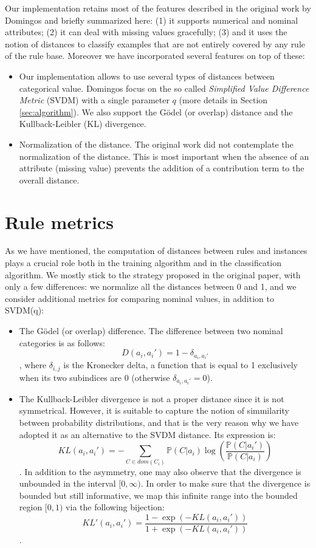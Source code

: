\documentclass[a4paper]{article}
\begin{document}
Our implementation retains most of the features described in the original work by Domingos and briefly summarized here: (1) it supports numerical and nominal attributes; (2) it can deal with missing values gracefully; (3) and it uses the notion of distances to classify examples that are not entirely covered by any rule of the rule base. Moreover we have incorporated several features on top of these:
\begin{itemize}
	\item Our implementation allows to use several types of distances between categorical value. Domingos focus on the so called \emph{Simplified Value Difference Metric} (SVDM) with a single parameter $ q $ (more details in Section \ref{sec:algorithm}). We also support the G\"odel (or overlap) distance and the Kullback-Leibler (KL) divergence.
    \item Normalization of the distance. The original work did not contemplate the normalization of the distance. This is most important when the absence of an attribute (missing value) prevents the addition of a contribution term to the overall distance.
\end{itemize}

\section{Rule metrics}
\label{sec:distance}

As we have mentioned, the computation of distances between rules and instances plays a crucial role both in the training algorithm and in the classification algorithm. We mostly stick to the strategy proposed in the original paper, with only a few differences: we normalize all the distances between 0 and 1, and we consider additional metrics for comparing nominal values, in addition to SVDM(q):
\begin{itemize}
	\item The G\"odel (or overlap) difference. The difference between two nominal categories is as follows:
	\[D(a_i, a_i') = 1 - \delta_{a_i, a_i'} \],
	where $ \delta_{i,j} $ is the Kronecker delta, a function that is equal to 1 exclusively when its two subindices are 0 (otherwise $ \delta_{a_i, a_i'} = 0 $).
	\item The Kullback-Leibler divergence is not a proper distance since it is not symmetrical. However, it is suitable to capture the notion of simmilarity between probability distributions, and that is the very reason why we have adopted it as an alternative to the SVDM distance. Its expression is:
	\[ KL(a_i, a_i') = -\sum_{C \in dom(C_i)} \mathbb{P}(C|a_i) \log \left( \frac{\mathbb{P}(C|a_i')}{\mathbb{P}(C|a_i)} \right) \].
	In addition to the asymmetry, one may also observe that the divergence is unbounded in the interval $ [0, \infty) $. In order to make sure that the divergence is bounded but still informative, we map this infinite range into the bounded region $ [0, 1) $ via the following bijection:
	\[ KL'(a_i, a_i') = \frac{1 - \exp(-KL(a_i, a_i'))}{1 + \exp(-KL(a_i, a_i'))} \].
\end{itemize}
\end{document}
